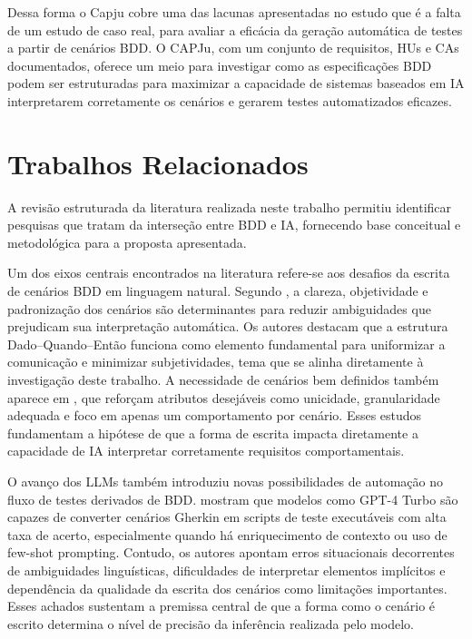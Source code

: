 Dessa forma o Capju cobre uma das lacunas apresentadas no estudo  que é a falta de um estudo de caso real, para avaliar a eficácia da geração automática de testes a partir de cenários BDD. O CAPJu, com um conjunto de requisitos, HUs e CAs documentados, oferece um meio para investigar como as especificações BDD podem ser estruturadas para maximizar a capacidade de sistemas baseados em IA interpretarem corretamente os cenários e gerarem testes automatizados eficazes.

\section{Trabalhos Relacionados}

A revisão estruturada da literatura realizada neste trabalho permitiu identificar pesquisas que tratam da interseção entre BDD e IA, fornecendo base conceitual e metodológica para a proposta apresentada.

Um dos eixos centrais encontrados na literatura refere-se aos desafios da escrita de cenários BDD em linguagem natural. Segundo , a clareza, objetividade e padronização dos cenários são determinantes para reduzir ambiguidades que prejudicam sua interpretação automática. Os autores destacam que a estrutura Dado–Quando–Então funciona como elemento fundamental para uniformizar a comunicação e minimizar subjetividades, tema que se alinha diretamente à investigação deste trabalho. A necessidade de cenários bem definidos também aparece em , que reforçam atributos desejáveis como unicidade, granularidade adequada e foco em apenas um comportamento por cenário. Esses estudos fundamentam a hipótese de que a forma de escrita impacta diretamente a capacidade de IA interpretar corretamente requisitos comportamentais.

O avanço dos LLMs também introduziu novas possibilidades de automação no fluxo de testes derivados de BDD.  mostram que modelos como GPT-4 Turbo são capazes de converter cenários Gherkin em scripts de teste executáveis com alta taxa de acerto, especialmente quando há enriquecimento de contexto ou uso de few-shot prompting. Contudo, os autores apontam erros situacionais decorrentes de ambiguidades linguísticas, dificuldades de interpretar elementos implícitos e dependência da qualidade da escrita dos cenários como limitações importantes. Esses achados sustentam a premissa central de que a forma como o cenário é escrito determina o nível de precisão da inferência realizada pelo modelo.

